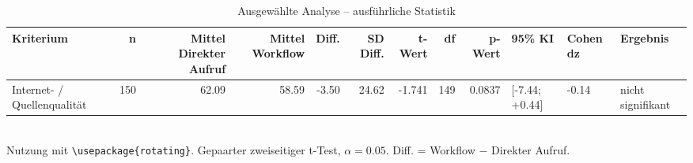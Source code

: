 \begin{table}
\centering
\caption{Ausgewählte Analyse -- ausführliche Statistik}
\begin{tabular}{lrrrrrrrrlll}
\toprule
Kriterium & n & Mittel Direkter Aufruf & Mittel Workflow & Diff. & SD Diff. & t-Wert & df & p-Wert & 95\% KI & Cohen dz & Ergebnis \\
\midrule
Internet- / Quellenqualität & 150 & 62.09 & 58.59 & -3.50 & 24.62 & -1.741 & 149 & 0.0837 & [-7.44; +0.44] & -0.14 & nicht signifikant \\
\bottomrule
\end{tabular}
\\[2mm]
\footnotesize Nutzung mit \texttt{\textbackslash usepackage\{rotating\}}. Gepaarter zweiseitiger t-Test, $\alpha=0.05$. Diff. = Workflow $-$ Direkter Aufruf.
\end{table}
